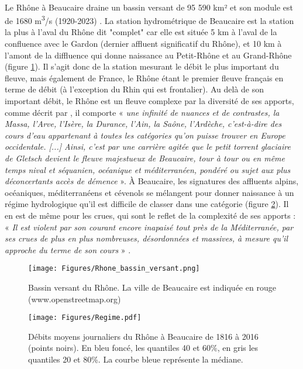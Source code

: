 \documentclass[11pt]{article}
\begin{document}
	\paragraph{} Le Rhône à Beaucaire draine un bassin versant de 95 590 km² et son module est de 1680 m\textsuperscript{3}/s (1920-2023) \citep{medd_banque_2021}. La station hydrométrique de Beaucaire est la station la plus à l'aval du Rhône dit "complet" car elle est située 5 km à l'aval de la confluence avec le Gardon (dernier affluent significatif du Rhône), et 10 km à l'amont de la diffluence qui donne naissance au Petit-Rhône et au Grand-Rhône (figure \ref{fig:BV}). Il s'agit donc de la station mesurant le débit le plus important du fleuve, mais également de France, le Rhône étant le premier fleuve français en terme de débit (à l'exception du Rhin qui est frontalier). Au delà de son important débit, le Rhône est un fleuve complexe par la diversité de ses apports, comme décrit par \citet{parde_regime_1925}, il comporte « \textit{ une infinité de nuances et de contrastes, la Massa, l'Arve, l'Isère, la Durance, l'Ain, la Saône, l'Ardèche, c'est-à-dire des cours d'eau appartenant à toutes les catégories qu'on puisse trouver en Europe occidentale. [...] Ainsi, c'est par une carrière agitée que le petit torrent glaciaire de Gletsch devient le fleuve majestueux de Beaucaire, tour à tour ou en même temps nival et séquanien, océanique et méditerranéen, pondéré ou sujet aux plus déconcertants accès de démence} ». À Beaucaire, les signatures des affluents alpins, océaniques, méditerranéens et cévenols se mélangent pour donner naissance à un régime hydrologique qu'il est difficile de classer dans une catégorie (figure \ref{fig:Regime}). Il en est de même pour les crues, qui sont le reflet de la complexité de ses apports : « \textit{Il est violent par son courant encore inapaisé tout près de la Méditerranée, par ses crues de plus en plus nombreuses, désordonnées et massives, à mesure qu'il approche du terme de son cours} » \citep{parde_regime_1925}. 


	\begin{figure}[h!]
	\centering
		\texttt{[image: Figures/Rhone\_bassin\_versant.png]}
        \caption{Bassin versant du Rhône. La ville de Beaucaire est indiquée en rouge (www.openstreetmap.org)}	
		\label{fig:BV}
	\end{figure}
	
	\begin{figure}[h!]
	\centering
		\texttt{[image: Figures/Regime.pdf]}
        \caption{Débits moyens journaliers du Rhône à Beaucaire de 1816 à 2016 (points noirs). En bleu foncé, les quantiles 40 et 60\%, en gris les quantiles 20 et 80\%. La courbe bleue représente la médiane.}	
		\label{fig:Regime}
	\end{figure}
	
\end{document}
